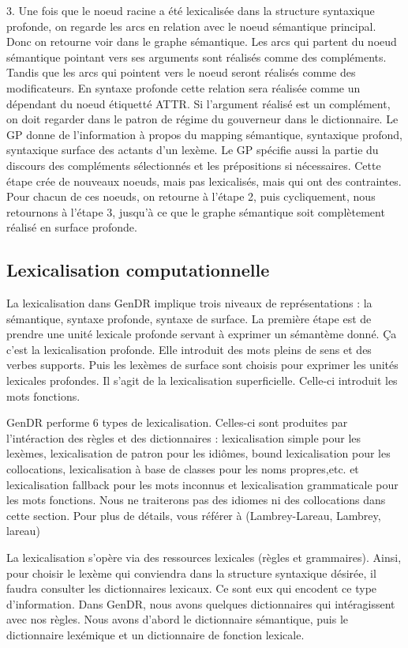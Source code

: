 3.	Une fois que le noeud racine a été lexicalisée dans la structure syntaxique profonde, on regarde les arcs en relation avec le noeud sémantique principal. Donc on retourne voir dans le graphe sémantique. Les arcs qui partent du noeud sémantique pointant vers ses arguments sont réalisés comme des compléments. Tandis que les arcs qui pointent vers le noeud seront réalisés comme des modificateurs. En syntaxe profonde cette relation sera réalisée comme un dépendant du noeud étiquetté ATTR. Si l'argument réalisé est un complément, on doit regarder dans le patron de régime du gouverneur dans le dictionnaire. Le GP donne de l'information à propos du mapping sémantique, syntaxique profond, syntaxique surface des actants d'un lexème. Le GP spécifie aussi la partie du discours des compléments sélectionnés et les prépositions si nécessaires. Cette étape crée de nouveaux noeuds, mais pas lexicalisés, mais qui ont des contraintes. Pour chacun de ces noeuds, on retourne à l'étape 2, puis cycliquement, nous retournons à l'étape 3,  jusqu'à ce que le graphe sémantique soit complètement réalisé en surface profonde.

\subsection{Lexicalisation computationnelle}

La lexicalisation dans GenDR implique trois niveaux de représentations : la sémantique, syntaxe profonde, syntaxe de surface. La première étape est de prendre une unité lexicale profonde servant à exprimer un sémantème donné. Ça c'est la lexicalisation profonde. Elle introduit des mots pleins de sens et des verbes supports. Puis les lexèmes de surface sont choisis pour exprimer les unités lexicales profondes. Il s'agit de la lexicalisation superficielle. Celle-ci introduit les mots fonctions.

GenDR performe 6 types de lexicalisation. Celles-ci sont produites par l'intéraction des règles et des dictionnaires : lexicalisation simple pour les lexèmes, lexicalisation de patron pour les idiômes, bound lexicalisation pour les collocations, lexicalisation à base de classes pour les noms propres,etc. et lexicalisation fallback pour les mots inconnus et lexicalisation grammaticale pour les mots fonctions.  Nous ne traiterons pas des idiomes ni des collocations dans cette section. Pour plus de détails, vous référer à (Lambrey-Lareau, Lambrey, lareau)

La lexicalisation s'opère via des ressources lexicales (règles et grammaires). Ainsi, pour choisir le lexème qui conviendra dans la structure syntaxique désirée, il faudra consulter les dictionnaires lexicaux. Ce sont eux qui encodent ce type d'information. Dans GenDR, nous avons quelques dictionnaires qui intéragissent avec nos règles. Nous avons d'abord le dictionnaire sémantique, puis le dictionnaire lexémique et un dictionnaire de fonction lexicale.

